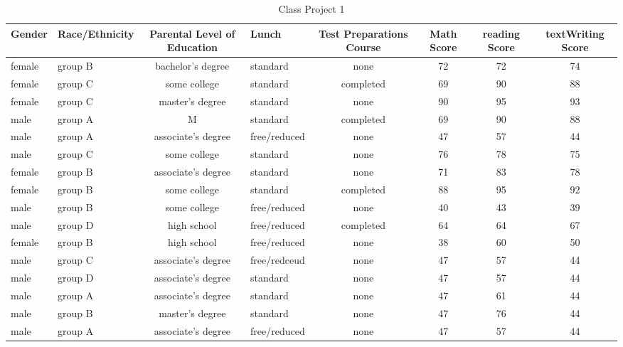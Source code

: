 \documentclass{article}
\begin{document}
	\begin{table}[h!]
	\begin{center}
		\caption{Class Project 1}
		\label{tab:table1}
		\begin{small}
		\begin{tabular}{|l|m{1.8cm}|c|m{1.5cm}|c|c|c|c|} %
			\hline
		\cellcolor{blue!35}Gender & \cellcolor{blue!35}Race/Ethnicity & \cellcolor{blue!35}Parental Level of Education & \cellcolor{blue!35}Lunch & \cellcolor{blue!35}Test Preparations Course & 	\cellcolor{blue!35}Math Score & \cellcolor{blue!35}reading Score & \cellcolor{blue!35}textWriting Score\\				
				\hline
		\cellcolor{blue!25}female & group B & bachelor's degree & standard & none & 72 & 72 & 74\\
		\hline
		\cellcolor{blue!25}female & group C & some college & standard & completed & 69 & 90 & 88\\
		\hline
		\cellcolor{blue!25}female & group C  & master's degree & standard & none & 90 & 95 & 93 \\
		\hline
		\cellcolor{blue!25}male & group A & M & standard & completed & 69 & 90 & 88\\
		\hline
		\cellcolor{blue!25}male & group A & associate's degree & free/reduced & none & 47 & 57 & 44\\
		\hline
		\cellcolor{blue!25}male & group C & some college & standard & none & 76 & 78 & 75\\
		\hline
		\cellcolor{blue!25}female & group B & associate's degree & standard & none & 71 & 83 & 78\\
		\hline
		\cellcolor{blue!25}female & group B & some college & standard & completed & 88 & 95 & 92\\
		\hline
		\cellcolor{blue!25}male & group B & some college & free/reduced & none & 40 & 43 & 39\\
		\hline
		\cellcolor{blue!25}male & group D & high school & free/reduced & completed & 64 & 64 & 67\\
		\hline
		\cellcolor{blue!25}female & group B & high school & free/reduced & none & 38 & 60 & 50\\
		\hline
		\cellcolor{blue!25}male & group C & associate's degree & free/redceud & none & 47 & 57 & 44\\
		\hline
		\cellcolor{blue!25}male & group D & associate's degree & standard & none & 47 & 57 & 44\\
		\hline
		\cellcolor{blue!25}male & group A & associate's degree & standard & none & 47 & 61 & 44\\
		\hline
		\cellcolor{blue!25}male & group B & master's degree & standard & none & 47 & 76 & 44\\
		\hline
		\cellcolor{blue!25}	male & group A & associate's degree & free/reduced & none & 47 & 57 & 44\\
				\hline				
			\end{tabular}
		\end{small}
	\end{center}
	\end{table}	
\end{document}
